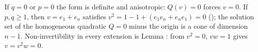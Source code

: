 If $q = 0$ or $p = 0$ the form is definite and anisotropic: $Q(v) = 0$ forces $v = 0$. If $p, q \geq 1$, then $v = e_1 + e_n$ satisfies $v^2 = 1 - 1 + (e_1e_n + e_ne_1) = 0$ (); the solution set of the homogeneous quadratic $Q = 0$ minus the origin is a cone of dimension $n-1$. Non-invertibility in every extension is Lemma : from $v^2 = 0$, $vw = 1$ gives $v = v^2 w = 0$.
